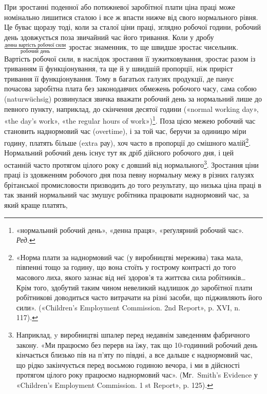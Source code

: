 При зростанні поденної або потижневої заробітної плати ціна
праці може номінально лишитися сталою і все ж впасти нижче
від свого нормального рівня. Це буває щоразу тоді, коли за сталої
ціни праці, зглядно робочої години, робочий день здовжується
поза звичайний час його тривання. Коли у дробу
$\frac{\text{денна вартість робочої сили}}{\text{робочий день}}$ зростає
знаменник, то ще швидше зростає чисельник. Вартість робочої сили, в наслідок зростання її
зужитковування, зростає разом із триванням
її функціонування, та ще й у швидшій пропорції, ніж приріст тривання її
функціонування. Тому в багатьох галузях продукції, де панує
почасова заробітна плата без законодавчих обмежень робочого
часу, сама собою (naturwüchsig) розвинулася звичка вважати
робочий день за нормальний лише до певного пункту, наприклад,
до скінчення десятої години («normal working day», «the day’s
work», «the regular hours of work»)\footnote*{
«нормальний робочий день», «денна праця», «реґулярний робочий
час». \emph{Ред.}
}. Поза цією межею робочий
час становить наднормовий час (overtime), і за той час, беручи
за одиницю міри годину, платять більше (extra рау), хоч часто
в пропорції до смішного малій\footnote{
«Норма плати за наднормовий час (у виробництві мережива) така
мала, півпенні тощо за годину, що вона стоїть у гострому контрасті до
того масового лиха, якого зазнає від неї здоров’я та життєва сила робітників\dots{}
Крім того, здобутий таким чином невеликий надлишок до заробітної
плати робітникові доводиться часто витрачати на різні засоби,
що підживляють його сили». («Children’s Employment Commission. 2nd
Report», p. XVI, n. 117).
}. Нормальний робочий день
існує тут як дріб дійсного робочого дня, і цей останній часто протягом
цілого року є довший від нормального\footnote{
Наприклад, y виробництві шпалер перед недавнім заведенням
фабричного закону. «Ми працюємо без перерв на їжу, так що 10-годинний
робочий день кінчається близько пів на п’яту по півдні, а все
дальше є наднормовий час, що рідко закінчується перед восьмою годиною
вечора, і ми в дійсності протягом цілого року працюємо наднормовий
час». (Мг.~Smith’s Evidence у «Children’s Employment Commission.
1 st Report», p. 125).
}. Зростання ціни
праці із здовженням робочого дня поза певну нормальну межу
в різних галузях брітанської промисловости призводить до того
результату, що низька ціна праці в так званий нормальний час змушує
робітника працювати наднормовий час, за який краще платять,
